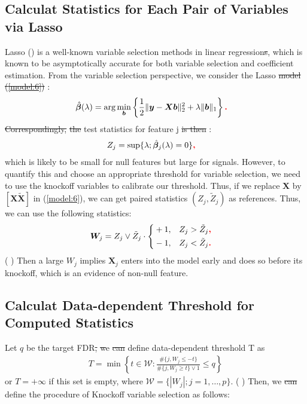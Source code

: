 \documentclass{uwstat572}
\newcommand{\vmdel}[1]{\sout{#1}}
\newcommand{\vmadd}[1]{\textbf{\color{red}{#1}}}
\newcommand{\vmcomment}[1]{({\color{blue}{VM's comment:}} \textbf{\color{blue}{#1}})}
\begin{document}
\subsection{Calculat\vmadd{ing} Statistics for Each Pair of Variables via Lasso}
Lasso (\cite{tibshirani1996regression}) is a well-known variable selection methods in linear regression\vmdel{s}, which is known to be asymptotically accurate for both variable selection and coefficient estimation. From the variable selection perspective, we consider the Lasso 
\vmdel{model (\ref{model:6})} \vmadd{estimator}:
\begin{align}\label{model:6}
& \hat{\bm{\beta}}(\lambda) = \arg\min_{\bm b} \left\{\frac{1}{2}\|\bm{y} - \bm{X}\bm{b} \|_2^2 + \lambda\|\bm{b}\|_1 \right\}\vmadd{.}
\end{align}
\vmdel{Correspondingly,} \vmadd{Let's define} \vmdel{the} \vmadd{a} test statistics for feature j \vmdel{is then} \vmadd{as follows}:
\begin{align}
& Z_j = \sup\{\lambda; \hat{\bm{\beta}}_j(\lambda)=0 \}\vmadd{,}
\end{align}
which is likely to be small for null features but large for signals.
However, to quantify this and \vmadd{to} choose an appropriate threshold for variable selection, we need to use the knockoff variables to calibrate our threshold. Thus, if we replace $\bm{X}$ by $[\bm{X} \bm{\tilde{X}}]$ in (\ref{model:6}), we can get paired statistics $(Z_j, \tilde{Z}_j)$ as references. Thus, we can use the following statistics:
\begin{align}\label{eq:7}
& \bm{W}_j = Z_j\vee \tilde{Z}_j \cdot \left\{\begin{aligned}
& +1, & 	Z_j > \tilde{Z}_j\vmadd{,}\\ & -1, & 	Z_j < \tilde{Z}_j\vmadd{.} 
\end{aligned} \right.
\end{align}
\vmcomment{Why is $W_j$ bolded above?}
Then a large $W_j$ implies ${\bm X}_j$ enters into the model early and does so before its knockoff, which is an evidence of non-null feature.

\subsection{Calculat\vmadd{ing} Data-dependent Threshold for Computed Statistics}
Let $q$ be the target FDR\vmdel{,}\vmadd{.} \vmdel{w}\vmadd{W}e \vmdel{can} define data-dependent threshold T as 
\begin{align}\label{eq:8}
T  = \min\left\{t\in\mathcal{W}: \frac{\#\{j, W_j\leq -t\}}{\#\{j, W_j\geq t\}\vee 1}\leq q \right\}
\end{align}
or $T=+\infty$ if this set is empty, where $\mathcal{W} = \{|W_j|;j=1,\dots,p \}$. 
\vmcomment{Explain the formula above in words.}
Then, we \vmdel{can} define the procedure of Knockoff variable selection as follows:
\end{document}
